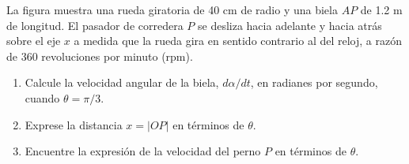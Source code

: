 \item La figura muestra una rueda giratoria de 40 cm de radio y una biela $AP$ de 1.2 m de longitud. El pasador de corredera $P$ se desliza hacia adelante y hacia atrás sobre el eje $x$ a medida que la rueda gira en sentido contrario al del reloj, a razón de 360 revoluciones por minuto (rpm).
\begin{enumerate}
    \item[(a)] Calcule la velocidad angular de la biela, $d\alpha/dt$, en radianes por segundo, cuando $\theta = \pi/3$.
    \item[(b)] Exprese la distancia $x = |OP|$ en términos de $\theta$.
    \item[(c)] Encuentre la expresión de la velocidad del perno $P$ en términos de $\theta$.
\end{enumerate}
\begin{center}
\end{center}
